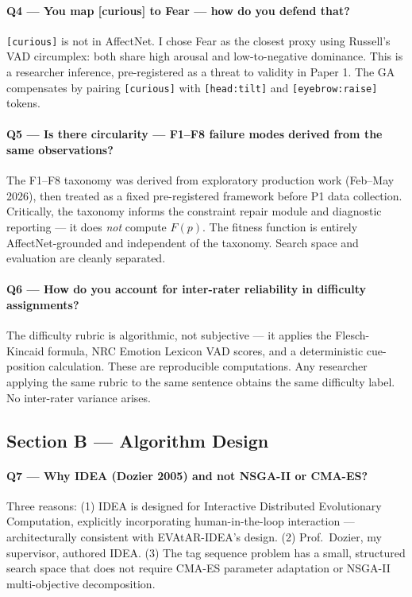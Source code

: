 \documentclass[12pt,a4paper]{article}
\begin{document}
\paragraph{Q4 --- You map [curious] to Fear --- how do you defend that?}
\texttt{[curious]} is not in AffectNet. I chose Fear as the closest proxy using Russell's VAD circumplex: both share high arousal and low-to-negative dominance. This is a researcher inference, pre-registered as a threat to validity in Paper 1. The GA compensates by pairing \texttt{[curious]} with \texttt{[head:tilt]} and \texttt{[eyebrow:raise]} tokens.

\paragraph{Q5 --- Is there circularity --- F1--F8 failure modes derived from the same observations?}
The F1--F8 taxonomy was derived from exploratory production work (Feb--May 2026), then treated as a fixed pre-registered framework before P1 data collection. Critically, the taxonomy informs the constraint repair module and diagnostic reporting --- it does \textit{not} compute $F(p)$. The fitness function is entirely AffectNet-grounded and independent of the taxonomy. Search space and evaluation are cleanly separated.

\paragraph{Q6 --- How do you account for inter-rater reliability in difficulty assignments?}
The difficulty rubric is algorithmic, not subjective --- it applies the Flesch-Kincaid formula, NRC Emotion Lexicon VAD scores, and a deterministic cue-position calculation. These are reproducible computations. Any researcher applying the same rubric to the same sentence obtains the same difficulty label. No inter-rater variance arises.

\subsection*{Section B --- Algorithm Design}

\paragraph{Q7 --- Why IDEA (Dozier 2005) and not NSGA-II or CMA-ES?}
Three reasons: (1) IDEA is designed for Interactive Distributed Evolutionary Computation, explicitly incorporating human-in-the-loop interaction --- architecturally consistent with EVAtAR-IDEA's design. (2) Prof.\ Dozier, my supervisor, authored IDEA. (3) The tag sequence problem has a small, structured search space that does not require CMA-ES parameter adaptation or NSGA-II multi-objective decomposition.
\end{document}
